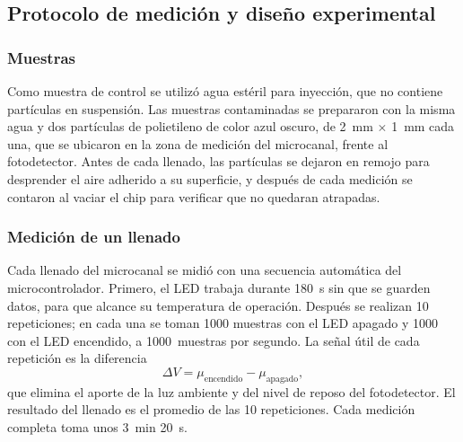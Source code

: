 


\subsection{Protocolo de medición y diseño experimental}

\subsubsection{Muestras}

Como muestra de control se utilizó agua estéril para inyección, que no contiene
partículas en suspensión. Las muestras contaminadas se prepararon con la misma
agua y dos partículas de polietileno de color azul oscuro, de 2~mm $\times$ 1~mm
cada una, que se ubicaron en la zona de medición del microcanal,
frente al fotodetector. Antes de cada llenado, las partículas se dejaron en remojo
para desprender el aire adherido a su superficie, y después de cada medición se
contaron al vaciar el chip para verificar que no quedaran atrapadas.

\subsubsection{Medición de un llenado}

Cada llenado del microcanal se midió con una secuencia automática del
microcontrolador. Primero, el LED trabaja durante 180~s sin que se guarden datos,
para que alcance su temperatura de operación. Después se realizan 10 repeticiones;
en cada una se toman 1000 muestras con el LED apagado y 1000 con el LED encendido, a
1000~muestras por segundo. La señal útil de cada repetición es la diferencia
\begin{equation}
  \Delta V = \mu_{\mathrm{encendido}} - \mu_{\mathrm{apagado}},
\end{equation}
que elimina el aporte de la luz ambiente y del nivel de reposo del fotodetector.
El resultado del llenado es el promedio de las 10 repeticiones. Cada medición
completa toma unos 3~min 20~s.

